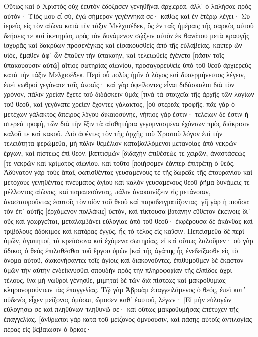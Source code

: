 Οὕτως καὶ ὁ Χριστὸς οὐχ ἑαυτὸν ἐδόξασεν γενηθῆναι ἀρχιερέα, ἀλλ᾽ ὁ λαλήσας πρὸς αὐτόν· Υἱός μου εἶ σύ, ἐγὼ σήμερον γεγέννηκά σε· 
καθὼς καὶ ἐν ἑτέρῳ λέγει· Σὺ ἱερεὺς εἰς τὸν αἰῶνα κατὰ τὴν τάξιν Μελχισέδεκ, 
ὃς ἐν ταῖς ἡμέραις τῆς σαρκὸς αὐτοῦ δεήσεις τε καὶ ἱκετηρίας πρὸς τὸν δυνάμενον σῴζειν αὐτὸν ἐκ θανάτου μετὰ κραυγῆς ἰσχυρᾶς καὶ δακρύων προσενέγκας καὶ εἰσακουσθεὶς ἀπὸ τῆς εὐλαβείας, 
καίπερ ὢν υἱός, ἔμαθεν ἀφ᾽ ὧν ἔπαθεν τὴν ὑπακοήν, 
καὶ τελειωθεὶς ἐγένετο [πᾶσιν τοῖς ὑπακούουσιν αὐτῷ] αἴτιος σωτηρίας αἰωνίου, 
προσαγορευθεὶς ὑπὸ τοῦ θεοῦ ἀρχιερεὺς κατὰ τὴν τάξιν Μελχισέδεκ. 
Περὶ οὗ πολὺς ἡμῖν ὁ λόγος καὶ δυσερμήνευτος λέγειν, ἐπεὶ νωθροὶ γεγόνατε ταῖς ἀκοαῖς· 
καὶ γὰρ ὀφείλοντες εἶναι διδάσκαλοι διὰ τὸν χρόνον, πάλιν χρείαν ἔχετε τοῦ διδάσκειν ὑμᾶς [τινὰ τὰ στοιχεῖα τῆς ἀρχῆς τῶν λογίων τοῦ θεοῦ, καὶ γεγόνατε χρείαν ἔχοντες γάλακτος, [οὐ στερεᾶς τροφῆς. 
πᾶς γὰρ ὁ μετέχων γάλακτος ἄπειρος λόγου δικαιοσύνης, νήπιος γάρ ἐστιν· 
τελείων δέ ἐστιν ἡ στερεὰ τροφή, τῶν διὰ τὴν ἕξιν τὰ αἰσθητήρια γεγυμνασμένα ἐχόντων πρὸς διάκρισιν καλοῦ τε καὶ κακοῦ. 
Διὸ ἀφέντες τὸν τῆς ἀρχῆς τοῦ Χριστοῦ λόγον ἐπὶ τὴν τελειότητα φερώμεθα, μὴ πάλιν θεμέλιον καταβαλλόμενοι μετανοίας ἀπὸ νεκρῶν ἔργων, καὶ πίστεως ἐπὶ θεόν, 
βαπτισμῶν [διδαχὴν ἐπιθέσεώς τε χειρῶν, ἀναστάσεώς [τε νεκρῶν καὶ κρίματος αἰωνίου. 
καὶ τοῦτο [ποιήσομεν ἐάνπερ ἐπιτρέπῃ ὁ θεός. 
Ἀδύνατον γὰρ τοὺς ἅπαξ φωτισθέντας γευσαμένους τε τῆς δωρεᾶς τῆς ἐπουρανίου καὶ μετόχους γενηθέντας πνεύματος ἁγίου 
καὶ καλὸν γευσαμένους θεοῦ ῥῆμα δυνάμεις τε μέλλοντος αἰῶνος, 
καὶ παραπεσόντας, πάλιν ἀνακαινίζειν εἰς μετάνοιαν, ἀνασταυροῦντας ἑαυτοῖς τὸν υἱὸν τοῦ θεοῦ καὶ παραδειγματίζοντας. 
γῆ γὰρ ἡ πιοῦσα τὸν ἐπ᾽ αὐτῆς [ἐρχόμενον πολλάκις] ὑετόν, καὶ τίκτουσα βοτάνην εὔθετον ἐκείνοις δι᾽ οὓς καὶ γεωργεῖται, μεταλαμβάνει εὐλογίας ἀπὸ τοῦ θεοῦ· 
ἐκφέρουσα δὲ ἀκάνθας καὶ τριβόλους ἀδόκιμος καὶ κατάρας ἐγγύς, ἧς τὸ τέλος εἰς καῦσιν. 
Πεπείσμεθα δὲ περὶ ὑμῶν, ἀγαπητοί, τὰ κρείσσονα καὶ ἐχόμενα σωτηρίας, εἰ καὶ οὕτως λαλοῦμεν· 
οὐ γὰρ ἄδικος ὁ θεὸς ἐπιλαθέσθαι τοῦ ἔργου ὑμῶν [καὶ τῆς ἀγάπης ἧς ἐνεδείξασθε εἰς τὸ ὄνομα αὐτοῦ, διακονήσαντες τοῖς ἁγίοις καὶ διακονοῦντες. 
ἐπιθυμοῦμεν δὲ ἕκαστον ὑμῶν τὴν αὐτὴν ἐνδείκνυσθαι σπουδὴν πρὸς τὴν πληροφορίαν τῆς ἐλπίδος ἄχρι τέλους, 
ἵνα μὴ νωθροὶ γένησθε, μιμηταὶ δὲ τῶν διὰ πίστεως καὶ μακροθυμίας κληρονομούντων τὰς ἐπαγγελίας. 
Τῷ γὰρ Ἀβραὰμ ἐπαγγειλάμενος ὁ θεός, ἐπεὶ κατ᾽ οὐδενὸς εἶχεν μείζονος ὀμόσαι, ὤμοσεν καθ᾽ ἑαυτοῦ, 
λέγων· [Εἰ μὴν εὐλογῶν εὐλογήσω σε καὶ πληθύνων πληθυνῶ σε· 
καὶ οὕτως μακροθυμήσας ἐπέτυχεν τῆς ἐπαγγελίας. 
[ἄνθρωποι γὰρ κατὰ τοῦ μείζονος ὀμνύουσιν, καὶ πάσης αὐτοῖς ἀντιλογίας πέρας εἰς βεβαίωσιν ὁ ὅρκος· 
